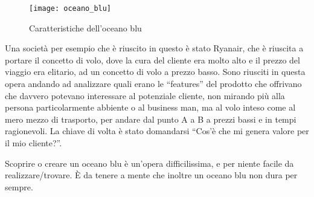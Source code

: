 \begin{figure}[t]
 \centering
 \texttt{[image: oceano\_blu]}
 \caption{Caratteristiche dell'oceano blu}
 \label{fig:bmi:oceano_blu}
\end{figure}

Una società per esempio che è riuscito in questo è stato Ryanair, che è
riuscita a portare il concetto di volo, dove la cura del cliente era molto alto
e il prezzo del viaggio era elitario, ad un concetto di volo a prezzo basso.
Sono riusciti in questa opera andando ad analizzare quali erano le ``features''
del prodotto che offrivano che davvero potevano interessare al potenziale
cliente, non mirando più alla persona particolarmente abbiente o al business
man, ma al volo inteso come al mero mezzo di trasporto, per andare dal punto A
a B a prezzi bassi e in tempi ragionevoli. La chiave di volta è stato
domandarsi ``Cos'è che mi genera valore per il mio cliente?''.

Scoprire o creare un oceano blu è un'opera difficilissima, e per niente facile
da realizzare/trovare. È da tenere a mente che inoltre un oceano blu non dura
per sempre.
